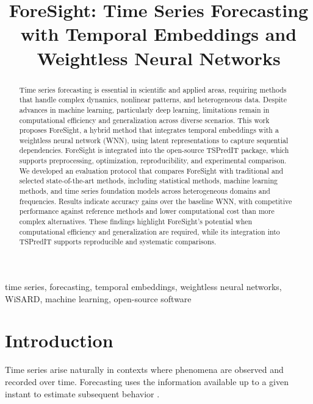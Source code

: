 \documentclass[final,3p,times,twocolumn,authoryear]{elsarticle}
\begin{document}
\begin{frontmatter}

\title{ForeSight: Time Series Forecasting with Temporal Embeddings and Weightless Neural Networks}


\begin{abstract}
Time series forecasting is essential in scientific and applied areas, requiring methods that handle complex dynamics, nonlinear patterns, and heterogeneous data. Despite advances in machine learning, particularly deep learning, limitations remain in computational efficiency and generalization across diverse scenarios. This work proposes ForeSight, a hybrid method that integrates temporal embeddings with a weightless neural network (WNN), using latent representations to capture sequential dependencies. ForeSight is integrated into the open-source TSPredIT package, which supports preprocessing, optimization, reproducibility, and experimental comparison. We developed an evaluation protocol that compares ForeSight with traditional and selected state-of-the-art methods, including statistical methods, machine learning methods, and time series foundation models across heterogeneous domains and frequencies. Results indicate accuracy gains over the baseline WNN, with competitive performance against reference methods and lower computational cost than more complex alternatives. These findings highlight ForeSight's potential when computational efficiency and generalization are required, while its integration into TSPredIT supports reproducible and systematic comparisons.
\end{abstract}

\begin{keyword}
time series, forecasting, temporal embeddings, weightless neural networks, WiSARD, machine learning, open-source software
\end{keyword}

\end{frontmatter}
\thispagestyle{plain}


\section{Introduction}
\label{sec_introdction}


Time series arise naturally in contexts where phenomena are observed and recorded over time. Forecasting uses the information available up to a given instant to estimate subsequent behavior \citep{han_data_2012, hyndman_forecasting_2021, gujarati_essentials_2021}.
\end{document}
